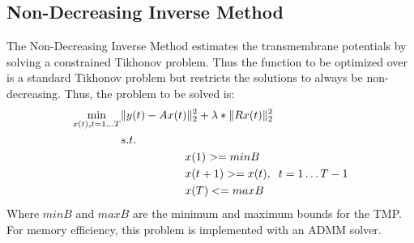 \subsection{Non-Decreasing Inverse Method}

    The Non-Decreasing Inverse Method estimates the transmembrane potentials by solving a constrained Tikhonov problem.
    Thus the function to be optimized over is a standard Tikhonov problem but restricts the solutions to always be non-decreasing.
    Thus, the problem to be solved is:
    \begin{equation}\begin{split}
    		\min_{x(t), t=1\dots T} &\|y(t) - Ax(t)\|_2^2 + \lambda*\|Rx(t)\|_2^2 \\
    		&s.t.\\
      		&\hspace{2cm}x(1) >= minB\\
         	&\hspace{2cm}x(t+1) >= x(t), \hspace{.2cm}t=1\dots T-1\\
         	&\hspace{2cm}x(T) <= maxB
    \end{split}
    \end{equation}
    Where $minB$ and $maxB$ are the minimum and maximum bounds for the TMP.
    For memory efficiency, this problem is implemented with an ADMM solver.

